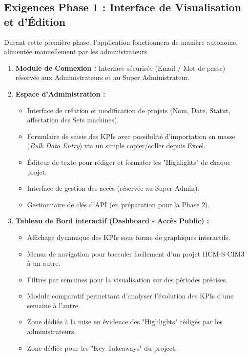 \subsection{Exigences Phase 1 : Interface de Visualisation et d'Édition}
Durant cette première phase, l'application fonctionnera de manière autonome, alimentée manuellement par les administrateurs.

\begin{enumerate}
    \item \textbf{Module de Connexion :} Interface sécurisée (Email / Mot de passe) réservée aux Administrateurs et au Super Administrateur.
    
    \item \textbf{Espace d'Administration :}
    \begin{itemize}
        \item Interface de création et modification de projets (Nom, Date, Statut, affectation des Sets machines).
        \item Formulaire de saisie des KPIs avec possibilité d'importation en masse (\textit{Bulk Data Entry}) via un simple copier/coller depuis Excel.
        \item Éditeur de texte pour rédiger et formater les "Highlights" de chaque projet.
        \item Interface de gestion des accès (réservée au Super Admin).
        \item Gestionnaire de clés d'API (en préparation pour la Phase 2).
    \end{itemize}
    
    \item \textbf{Tableau de Bord interactif (Dashboard - Accès Public) :}
    \begin{itemize}
        \item Affichage dynamique des KPIs sous forme de graphiques interactifs.
        \item Menus de navigation pour basculer facilement d'un projet HCM-S CIM3 à un autre.
        \item Filtres par semaines pour la visualisation sur des périodes précises.
        \item Module comparatif permettant d'analyser l'évolution des KPIs d'une semaine à l'autre.
        \item Zone dédiée à la mise en évidence des "Highlights" rédigés par les administrateurs.
        \item Zone dédiée pour les "Key Takeaways" du project.
    \end{itemize}
\end{enumerate}

